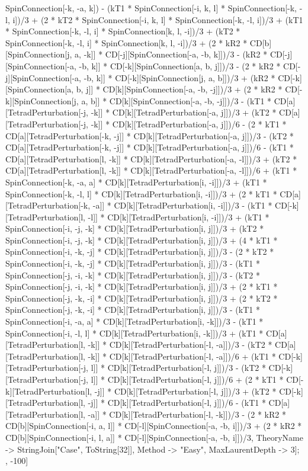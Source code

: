 SpinConnection[-k, -a, k]) - (kT1 * SpinConnection[-i, k, l] * SpinConnection[-k, -l, i])/3 + (2 * kT2 * SpinConnection[-i, k, l] * SpinConnection[-k, -l, i])/3 + (kT1 * SpinConnection[-k, -l, i] * SpinConnection[k, l, -i])/3 + (kT2 * SpinConnection[-k, -l, i] * SpinConnection[k, l, -i])/3 + (2 * kR2 * CD[b][SpinConnection[j, a, -k]] * CD[-j][SpinConnection[-a, -b, k]])/3 - (kR2 * CD[-j][SpinConnection[-a, -b, k]] * CD[-k][SpinConnection[a, b, j]])/3 - (2 * kR2 * CD[-j][SpinConnection[-a, -b, k]] * CD[-k][SpinConnection[j, a, b]])/3 + (kR2 * CD[-k][SpinConnection[a, b, j]] * CD[k][SpinConnection[-a, -b, -j]])/3 + (2 * kR2 * CD[-k][SpinConnection[j, a, b]] * CD[k][SpinConnection[-a, -b, -j]])/3 - (kT1 * CD[a][TetradPerturbation[-j, -k]] * CD[k][TetradPerturbation[-a, j]])/3 + (kT2 * CD[a][TetradPerturbation[-j, -k]] * CD[k][TetradPerturbation[-a, j]])/6 - (2 * kT1 * CD[a][TetradPerturbation[-k, -j]] * CD[k][TetradPerturbation[-a, j]])/3 - (kT2 * CD[a][TetradPerturbation[-k, -j]] * CD[k][TetradPerturbation[-a, j]])/6 - (kT1 * CD[a][TetradPerturbation[l, -k]] * CD[k][TetradPerturbation[-a, -l]])/3 + (kT2 * CD[a][TetradPerturbation[l, -k]] * CD[k][TetradPerturbation[-a, -l]])/6 + (kT1 * SpinConnection[-k, -a, a] * CD[k][TetradPerturbation[i, -i]])/3 + (kT1 * SpinConnection[-k, -l, l] * CD[k][TetradPerturbation[i, -i]])/3 + (2 * kT1 * CD[a][TetradPerturbation[-k, -a]] * CD[k][TetradPerturbation[i, -i]])/3 - (kT1 * CD[-k][TetradPerturbation[l, -l]] * CD[k][TetradPerturbation[i, -i]])/3 + (kT1 * SpinConnection[-i, -j, -k] * CD[k][TetradPerturbation[i, j]])/3 + (kT2 * SpinConnection[-i, -j, -k] * CD[k][TetradPerturbation[i, j]])/3 + (4 * kT1 * SpinConnection[-i, -k, -j] * CD[k][TetradPerturbation[i, j]])/3 - (2 * kT2 * SpinConnection[-i, -k, -j] * CD[k][TetradPerturbation[i, j]])/3 - (kT1 * SpinConnection[-j, -i, -k] * CD[k][TetradPerturbation[i, j]])/3 - (kT2 * SpinConnection[-j, -i, -k] * CD[k][TetradPerturbation[i, j]])/3 + (2 * kT1 * SpinConnection[-j, -k, -i] * CD[k][TetradPerturbation[i, j]])/3 + (2 * kT2 * SpinConnection[-j, -k, -i] * CD[k][TetradPerturbation[i, j]])/3 - (kT1 * SpinConnection[-i, -a, a] * CD[k][TetradPerturbation[i, -k]])/3 - (kT1 * SpinConnection[-i, -l, l] * CD[k][TetradPerturbation[i, -k]])/3 + (kT1 * CD[a][TetradPerturbation[l, -k]] * CD[k][TetradPerturbation[-l, -a]])/3 - (kT2 * CD[a][TetradPerturbation[l, -k]] * CD[k][TetradPerturbation[-l, -a]])/6 + (kT1 * CD[-k][TetradPerturbation[-j, l]] * CD[k][TetradPerturbation[-l, j]])/3 - (kT2 * CD[-k][TetradPerturbation[-j, l]] * CD[k][TetradPerturbation[-l, j]])/6 + (2 * kT1 * CD[-k][TetradPerturbation[l, -j]] * CD[k][TetradPerturbation[-l, j]])/3 + (kT2 * CD[-k][TetradPerturbation[l, -j]] * CD[k][TetradPerturbation[-l, j]])/6 - (kT1 * CD[a][TetradPerturbation[l, -a]] * CD[k][TetradPerturbation[-l, -k]])/3 - (2 * kR2 * CD[b][SpinConnection[-i, a, l]] * CD[-l][SpinConnection[-a, -b, i]])/3 + (2 * kR2 * CD[b][SpinConnection[-i, l, a]] * CD[-l][SpinConnection[-a, -b, i]])/3, TheoryName -> StringJoin["Case", ToString[32]], Method -> "Easy", MaxLaurentDepth -> 3]; , -100]